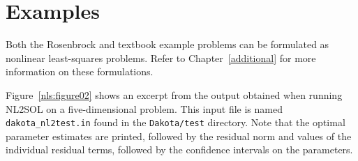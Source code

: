 \section{Examples}\label{nls:examples}

Both the Rosenbrock and textbook example problems can be formulated as
nonlinear least-squares problems. Refer to Chapter~\ref{additional}
for more information on these formulations.
%

Figure~\ref{nls:figure02} shows an excerpt from the output 
obtained when running NL2SOL on a five-dimensional problem. 
This input file is named \texttt{dakota\_nl2test.in} found 
in the \texttt{Dakota/test} directory. 
Note that the optimal parameter estimates are printed, 
followed by the residual norm and values of the individual 
residual terms, followed by the confidence intervals on the parameters. 


